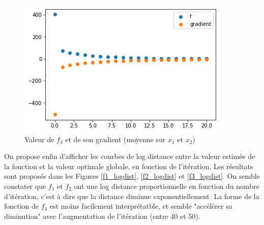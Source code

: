 \documentclass[a4paper]{article}
\begin{document}
\begin{figure}[ht!]
\begin{center}
\includegraphics[scale=0.5]{f3_optim_grad.png}
\caption{Valeur de $f_3$ et de son gradient (moyenne sur $x_1$ et $x_2$)}
\label{f3_optim_grad}
\end{center}
\end{figure}

On propose enfin d'afficher les courbes de log distance entre la valeur estimée de la fonction et la valeur optimale globale, en fonction de l'itération. Les résultats sont proposés dans les Figures \ref{f1_logdist}, \ref{f2_logdist} et \ref{f3_logdist}. On semble constater que $f_1$ et $f_2$ ont une log distance proportionnelle en fonction du nombre d'itération, c'est à dire que la distance diminue exponentiellement. La forme de la fonction de $f_3$ est moins facilement interprétatble, et semble "accélérer sa diminution" avec l'augmentation de l'itération (entre 40 et 50).
\end{document}
